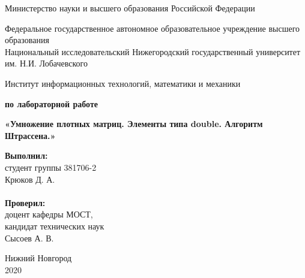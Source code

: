 \documentclass{report}
\begin{document}
\begin{titlepage}

\begin{center}
Министерство науки и высшего образования Российской Федерации
\end{center}

\begin{center}
Федеральное государственное автономное образовательное учреждение высшего образования \\
Национальный исследовательский Нижегородский государственный университет им. Н.И. Лобачевского
\end{center}

\begin{center}
Институт информационных технологий, математики и механики
\end{center}

\vspace{4em}

\begin{center}
\textbf{ по лабораторной работе} \\
\end{center}
\begin{center}
\textbf{\Large«Умножение плотных матриц. Элементы типа double. Алгоритм Штрассена.»} \\
\end{center}

\vspace{4em}

\newbox{\lbox}
\newlength{\maxl}
\setlength{\maxl}{\wd\lbox}
\hfill\parbox{7cm}{
\hspace*{5cm}\hspace*{-5cm}\textbf{Выполнил:} \\ студент группы 381706-2 \\ Крюков Д. А.\\
\\
\hspace*{5cm}\hspace*{-5cm}\textbf{Проверил:}\\ доцент кафедры МОСТ, \\ кандидат технических наук \\ Сысоев А. В.
}

\vspace{\fill}

\begin{center} Нижний Новгород \\ 2020 \end{center}

\end{titlepage}
\end{document}
